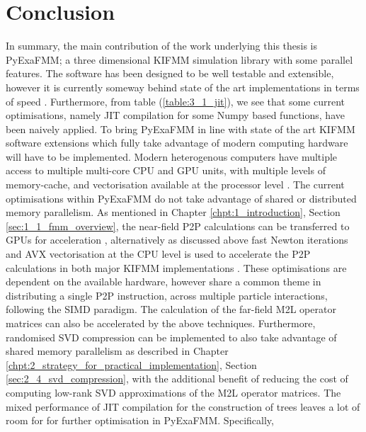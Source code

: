 \chapter{Conclusion}\label{chpt:conclusion}

In summary, the main contribution of the work underlying this thesis is
\gls{PyExaFMM}; a three dimensional \gls{KIFMM} simulation library
with some parallel features. The software has been designed to be well
testable and extensible, however it is currently someway behind state of the art
implementations in terms of speed \cite{Malhotra:2015:CCP, exafmm}.
Furthermore, from table (\ref{table:3_1_jit}),
we see that some current optimisations, namely \gls{JIT} compilation for some
Numpy based functions, have been naively applied. To bring
 \gls{PyExaFMM} in line with state of the art \gls{KIFMM} software
extensions which fully take advantage of modern computing hardware will
have to be implemented. Modern heterogenous computers have multiple access to
multiple multi-core \gls{CPU} and \gls{GPU} units, with multiple levels of
memory-cache, and vectorisation available at the processor level
\cite{Malhotra:2015:CCP}. The current optimisations within \gls{PyExaFMM} do not
take advantage of shared or distributed memory parallelism. As mentioned in
Chapter \ref{chpt:1_introduction}, Section \ref{sec:1_1_fmm_overview}, the near-field
\gls{P2P} calculations can be transferred to \gls{GPU}s for acceleration
\cite{Hwu:2011:MKP}, alternatively as discussed above fast Newton iterations and
\gls{AVX} vectorisation at the \gls{CPU} level
is used to accelerate the \gls{P2P} calculations in both major \gls{KIFMM}
implementations \cite{Malhotra:2015:CCP, exafmm}. These optimisations are
dependent on the available hardware, however share a common theme in distributing
a single \gls{P2P} instruction, across multiple particle interactions, following
the \gls{SIMD} paradigm. The calculation of the far-field \gls{M2L} operator
matrices can also be accelerated by the above techniques. Furthermore, randomised
\gls{SVD} compression \cite{Erichson:2019:JOSS, Halko:2011:SIAM} can be implemented
to also take advantage of shared memory parallelism as described in Chapter
\ref{chpt:2_strategy_for_practical_implementation}, Section \ref{sec:2_4_svd_compression},
with the additional benefit of reducing the cost of computing low-rank \gls{SVD}
approximations of the \gls{M2L} operator matrices.
The mixed performance of \gls{JIT} compilation for the construction of trees
leaves a lot of room for for further optimisation in \gls{PyExaFMM}. Specifically,

